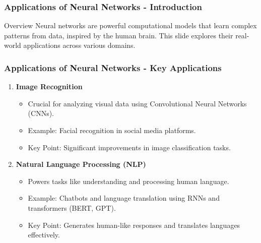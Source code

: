 \documentclass[aspectratio=169]{beamer}
\begin{document}
\begin{frame}[fragile]
    \frametitle{Applications of Neural Networks - Introduction}
    \begin{block}{Overview}
        Neural networks are powerful computational models that learn complex patterns from data, inspired by the human brain. This slide explores their real-world applications across various domains.
    \end{block}
\end{frame}

\begin{frame}[fragile]
    \frametitle{Applications of Neural Networks - Key Applications}
    \begin{enumerate}
        \item \textbf{Image Recognition}
        \begin{itemize}
            \item Crucial for analyzing visual data using Convolutional Neural Networks (CNNs).
            \item Example: Facial recognition in social media platforms.
            \item Key Point: Significant improvements in image classification tasks.
        \end{itemize}

        \item \textbf{Natural Language Processing (NLP)}
        \begin{itemize}
            \item Powers tasks like understanding and processing human language.
            \item Example: Chatbots and language translation using RNNs and transformers (BERT, GPT).
            \item Key Point: Generates human-like responses and translates languages effectively.
        \end{itemize}
    \end{enumerate}
\end{frame}
\end{document}
